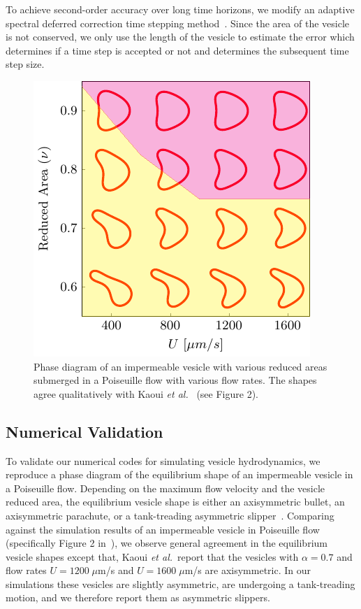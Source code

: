 \documentclass[prb,preprint,showpacs,preprintnumbers,amsmath,amssymb,longbibliography]{revtex4-1}
\newif\ifTikz
\begin{document}
To achieve second-order accuracy over long time horizons, we modify an
adaptive spectral deferred correction time stepping
method~\cite{qua-bir2016}. Since the area of the vesicle is not
conserved, we only use the length of the vesicle to estimate the error
which determines if a time step is accepted or not and determines the
subsequent time step size.

\begin{figure}[htp]
  \centering
  \ifTikz
  
  \else
  \includegraphics{figures/parabolicImpermeable.pdf}
  \fi
  \caption{\label{fig:PoiseuillePhase} Phase diagram of an impermeable
  vesicle with various reduced areas submerged in a Poiseuille flow with
  various flow rates. The shapes agree qualitatively with Kaoui {\em et
  al.}~\cite{kao-bir-mis2009} (see Figure 2).}
\end{figure}

\subsection{Numerical Validation\label{subsec:numerical_validation}}
To validate our numerical codes for simulating vesicle hydrodynamics, we reproduce a phase diagram of the equilibrium
shape of an impermeable vesicle in a Poiseuille flow. Depending on
the maximum flow velocity and the vesicle reduced area, the equilibrium vesicle shape is either an
axisymmetric bullet, an axisymmetric parachute, or a tank-treading
asymmetric slipper~\cite{kao-bir-mis2009}. Comparing against the simulation results of an impermeable vesicle in Poiseuille flow
(specifically Figure 2 in~\citet{kao-bir-mis2009}),
%
%
we observe general agreement in the equilibrium
vesicle shapes except that,
%
%
Kaoui {\em et al.}~report that the vesicles with $\alpha=0.7$
and flow rates $U = 1200\; \mu$m/s and $U = 1600\; \mu$m/s are
axisymmetric.  In our simulations these vesicles are slightly
asymmetric, are undergoing a tank-treading motion, and we therefore
report them as asymmetric slippers.
\end{document}
